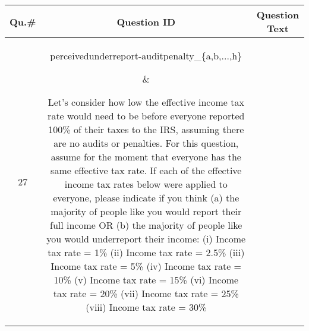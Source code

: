 \begin{table}[!h]
\footnotesize
{}
{
\setlength{\extrarowheight}{15pt}
 \begin{tabular}{|c|c|c|}\hline
\bf{Qu.\#} & \bf{Question ID} &\bf{Question Text}\\ \hline \hline 

27&  \parbox[c][0.05\textheight][c]{0.2\textwidth} {  perceivedunderreport-auditpenalty\_\{a,b,...,h\} }  &\parbox[c][0.17\textheight][c]{0.68\textwidth} {Let's consider how low the effective income tax rate would need to be before everyone reported 100\% of their taxes to the IRS, assuming there are no audits or penalties.  For this question, assume for the moment that everyone has the same effective tax rate.
If each of the effective income tax rates below were applied to everyone, please indicate if you think (a) the majority of people like you would report their full income OR (b) the majority of people like you would underreport their income: 
(i) Income tax rate = 1\% 
(ii) Income tax rate = 2.5\%
(iii) Income tax rate = 5\%
(iv) Income tax rate = 10\%
(v) Income tax rate = 15\%
(vi) Income tax rate = 20\%
(vii) Income tax rate = 25\%
(viii) Income tax rate = 30\%
}
\\  \hline
\end{tabular}
}
\end{table}